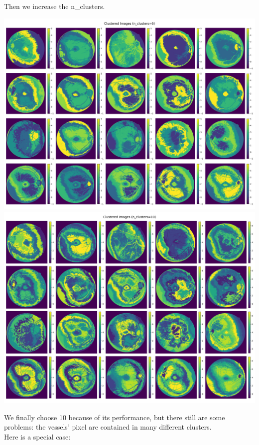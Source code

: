 \documentclass[12pt,letterpaper]{article}
\begin{document}
Then we increase the n\_clusters. 
\begin{center}
    \includegraphics[scale=0.3]{Figures/1-2 6 Clusters.png}
    \includegraphics[scale=0.3]{Figures/1-2 10 Clusters.png}
\end{center}
We finally choose 10 because of its performance, but there still are some problems: the vessels' pixel are contained in many different clusters. \\
Here is a special case: 
\end{document}
